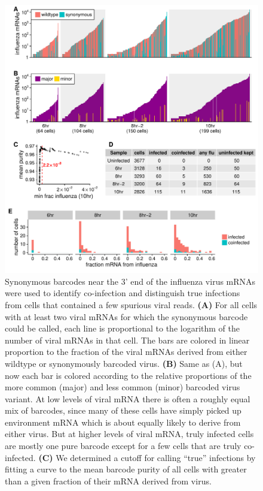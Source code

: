 \documentclass[9pt,lineno]{elife}
\begin{document}
\begin{figure}
\includegraphics[width=\linewidth]{figures/p_frac_flu_summary.pdf}
\caption{\label{fig:viralbarcodes}
Synonymous barcodes near the 3' end of the influenza virus mRNAs were used to identify co-infection and distinguish true infections from cells that contained a few spurious viral reads.
{\bf (A)}
For all cells with at least two viral mRNAs for which the synonymous barcode could be called, each line is proportional to the logarithm of the number of viral mRNAs in that cell.
The bars are colored in linear proportion to the fraction of the viral mRNAs derived from either wildtype or synonymously barcoded virus.
{\bf (B)}
Same as (A), but now each bar is colored according to the relative proportions of the more common (major) and less common (minor) barcoded virus variant.
At low levels of viral mRNA there is often a roughly equal mix of barcodes, since many of these cells have simply picked up environment mRNA which is about equally likely to derive from either virus.
But at higher levels of viral mRNA, truly infected cells are mostly one pure barcode except for a few cells that are truly co-infected.
{\bf (C)}
We determined a cutoff for calling ``true'' infections by fitting a curve to the mean barcode purity of all cells with greater than a given fraction of their mRNA derived from virus.
}
\end{figure}
\end{document}
